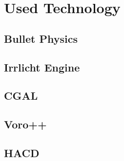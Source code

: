 \chapter{Used Technology}

\section{Bullet Physics}
\section{Irrlicht Engine}
\section{CGAL}
\section{Voro++}
\section{HACD}